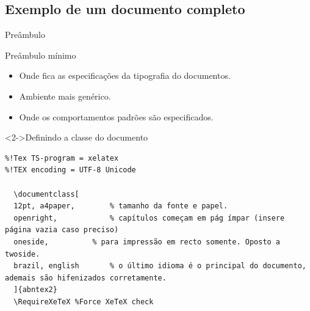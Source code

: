 \documentclass[bigger]{beamer}
\begin{document}
{\subsection{Exemplo de um documento completo}
\label{sec:org9f18cec}
\begin{frame}[label={sec:org1e4cf20},fragile]{Preâmbulo}
 \begin{block}{Preâmbulo mínimo}
\begin{itemize}
\item Onde fica as especificações da tipografia do documentos.
\item Ambiente mais genérico.
\item Onde os comportamentos padrões são especificados.
\end{itemize}
\end{block}

\begin{block}<2->{Definindo a classe do documento}
\begin{verbatim}
%!Tex TS-program = xelatex
%!TEX encoding = UTF-8 Unicode

  \documentclass[
  12pt, a4paper,		% tamanho da fonte e papel.
  openright,			% capítulos começam em pág ímpar (insere página vazia caso preciso)
  oneside,			% para impressão em recto somente. Oposto a twoside.
  brazil, english		% o último idioma é o principal do documento, ademais são hifenizados corretamente.
  ]{abntex2}
  \RequireXeTeX %Force XeTeX check
\end{verbatim}
\end{block}
\end{frame}

}
\end{document}
